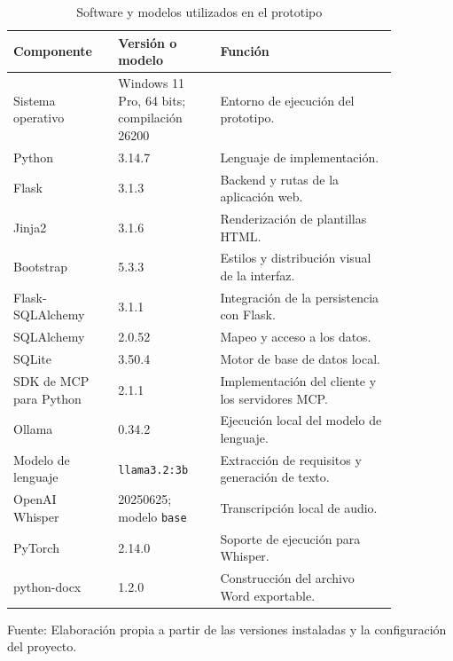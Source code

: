 \begin{table}[H]
    \centering
    \caption{Software y modelos utilizados en el prototipo}
    \label{tab:software-prototipo}
    \footnotesize
    \renewcommand{\arraystretch}{1.15}
    \begin{tabular}{|p{0.23\linewidth}|p{0.23\linewidth}|p{0.40\linewidth}|}
        \hline
        \textbf{Componente} &
        \textbf{Versión o modelo} &
        \textbf{Función} \\
        \hline
        Sistema operativo &
        Windows 11 Pro, 64 bits; compilación 26200 &
        Entorno de ejecución del prototipo. \\
        \hline
        Python &
        3.14.7 &
        Lenguaje de implementación. \\
        \hline
        Flask &
        3.1.3 &
        Backend y rutas de la aplicación web. \\
        \hline
        Jinja2 &
        3.1.6 &
        Renderización de plantillas HTML. \\
        \hline
        Bootstrap &
        5.3.3 &
        Estilos y distribución visual de la interfaz. \\
        \hline
        Flask-SQLAlchemy &
        3.1.1 &
        Integración de la persistencia con Flask. \\
        \hline
        SQLAlchemy &
        2.0.52 &
        Mapeo y acceso a los datos. \\
        \hline
        SQLite &
        3.50.4 &
        Motor de base de datos local. \\
        \hline
        SDK de MCP para Python &
        2.1.1 &
        Implementación del cliente y los servidores MCP. \\
        \hline
        Ollama &
        0.34.2 &
        Ejecución local del modelo de lenguaje. \\
        \hline
        Modelo de lenguaje &
        \texttt{llama3.2:3b} &
        Extracción de requisitos y generación de texto. \\
        \hline
        OpenAI Whisper &
        20250625; modelo \texttt{base} &
        Transcripción local de audio. \\
        \hline
        PyTorch &
        2.14.0 &
        Soporte de ejecución para Whisper. \\
        \hline
        python-docx &
        1.2.0 &
        Construcción del archivo Word exportable. \\
        \hline
    \end{tabular}

    \par\smallskip
    \begin{minipage}{0.95\linewidth}
        \footnotesize
        Fuente: Elaboración propia a partir de las
        versiones instaladas y la configuración del proyecto.
    \end{minipage}
\end{table}

